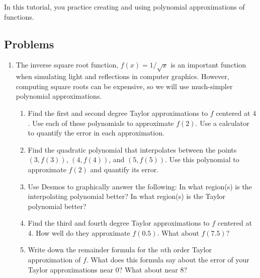 \begin{objectives}
	In this tutorial, you practice creating and using polynomial approximations of functions.
\end{objectives}



\subsection*{Problems}

\begin{enumerate}
	\item  The inverse square root function, $f(x) = 1/\sqrt{x}$ is an important function
	      when simulating light and reflections in computer graphics.  However, computing square
	      roots can be expensive, so we will use much-simpler polynomial approximations.
	      \begin{enumerate}
		      \item Find the first and second degree Taylor approximations to $f$ centered at $4$.
		            Use each of these polynomials to approximate $f(2)$. Use a calculator
		            to quantify the error in each approximation.
		      \item Find the quadratic polynomial that interpolates between the points
		            $(3,f(3))$, $(4,f(4))$, and $(5,f(5))$.
		            Use this polynomial to approximate $f(2)$ and quantify its error.

		      \item Use Desmos to graphically answer the following:
		            In what region(s) is the interpolating polynomial better?
		            In what region(s) is the Taylor polynomial better?

		      \item Find the third and fourth degree Taylor approximations to $f$ centered at $4$.
		            How well do they approximate $f(0.5)$. What about $f(7.5)$?

		      \item Write down the remainder formula for the $n$th order
		            Taylor approximation of $f$.
		            What does this formula say about the error of your Taylor approximations near $0$?
		            What about near $8$?
	      \end{enumerate}
          \clearpage


\end{enumerate}
